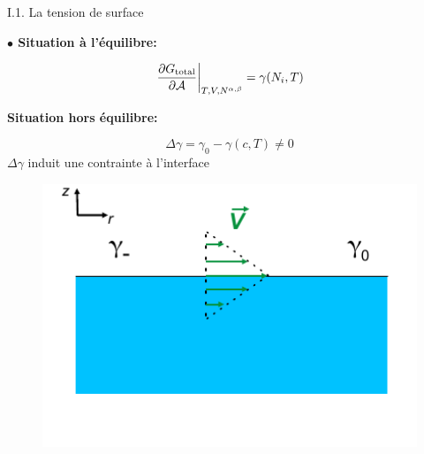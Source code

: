 \documentclass[aspectratio=169,10pt]{beamer}
\begin{document}
  \begin{frame}{I.1. La tension de surface}
    \begin{minipage}{6cm}
      \noindent \textbf{$\bullet$ Situation à l'équilibre:}
    \begin{figure}
     \centering
     \resizebox{.9\textwidth}{!}{}
   \end{figure}
   \begin{equation}
   \left.\frac{\partial G_{\rm total}}{\partial \mathcal{A}}\right|_{T,V,N^{\alpha, \beta}} = \gamma(N_i, T)
   \end{equation}
    \end{minipage}\hfill
    \begin{minipage}{6cm}
    \textbf{Situation hors équilibre:}
    \begin{ombredef}
      \begin{defi}
    \[\Delta \gamma = \gamma_0-\gamma(c,T)\neq 0\]
    $\Delta\gamma$ induit une contrainte à l'interface
      \end{defi}
    \end{ombredef}

      \begin{figure}
        \includegraphics[width=1\textwidth]{./figures/contrainte.pdf}
      \end{figure}
    \end{minipage}
  \end{frame}
\end{document}
